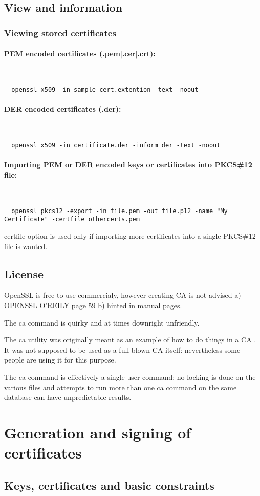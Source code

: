 \documentclass[10pt, a4paper]{report}
\newcommand{\myparagraph}[1]{\paragraph{#1}\mbox{}\\} %
\begin{document}
  \subsection{View and information}
  
\subsubsection{Viewing stored certificates}
\myparagraph{PEM encoded certificates (.pem$\vert$.cer$\vert$.crt):}
  \begin{verbatim}
  openssl x509 -in sample_cert.extention -text -noout
  \end{verbatim}
\myparagraph{DER encoded certificates (.der):}
  \begin{verbatim}
  openssl x509 -in certificate.der -inform der -text -noout
  \end{verbatim}
\myparagraph{Importing PEM or DER encoded keys or certificates into PKCS\#12 file:}
  \begin{verbatim}
  openssl pkcs12 -export -in file.pem -out file.p12 -name "My Certificate" -certfile othercerts.pem
  \end{verbatim}
certfile option is used only if importing more certificates into a single PKCS\#12 file is wanted.

  
  \subsection{License}
OpenSSL is free to use commercialy, however creating CA is not advised
a) OPENSSL O'REILY page 59 
b) hinted in manual pages.

The ca command is quirky and at times downright unfriendly.

The ca utility was originally meant as an example of how to do things in a CA . It was not supposed to be used as a full blown CA itself: nevertheless some people are using it for this purpose.

The ca command is effectively a single user command: no locking is done on the various files and attempts to run more than one ca command on the same database can have unpredictable results. 

  
\section{Generation and signing of certificates}

  \subsection{Keys, certificates and basic constraints}
  
\end{document}

